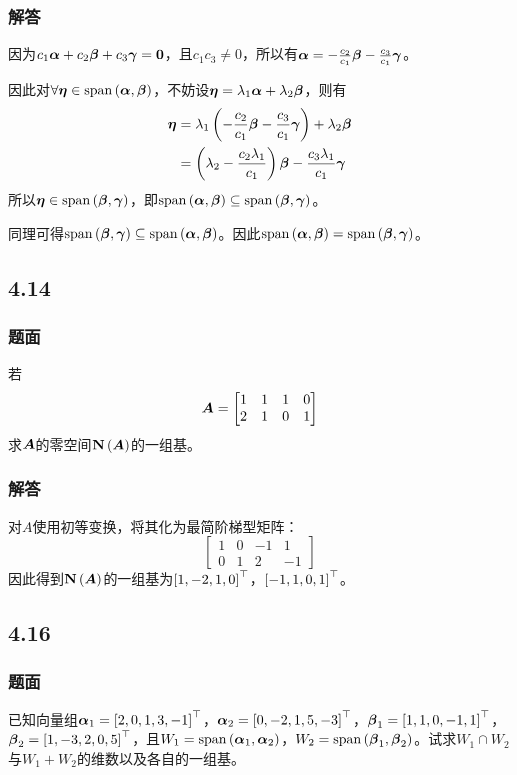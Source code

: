 \documentclass{beamer}
\begin{document}
\begin{frame}
    \frametitle{解答}
    因为\(c_1\boldsymbol{\alpha}+c_2\boldsymbol{\beta}+c_3\boldsymbol{\gamma}=\boldsymbol{0}\)，且\(c_1c_3\neq0\)，所以有\(\boldsymbol{\alpha}=-\frac{c_2}{c_1}\boldsymbol{\beta}-\frac{c_3}{c_1}\boldsymbol{\gamma}\)。

    因此对\(\forall\boldsymbol{\eta}\in\mathrm{span}\left( \boldsymbol{\alpha},\boldsymbol{\beta} \right)\)，不妨设\(\boldsymbol{\eta}=\lambda_1\boldsymbol{\alpha}+\lambda_2\boldsymbol{\beta}\)，则有
    \begin{align*}
        \boldsymbol{\eta} & =\lambda_1\left( -\frac{c_2}{c_1}\boldsymbol{\beta}-\frac{c_3}{c_1}\boldsymbol{\gamma} \right)+\lambda_2\boldsymbol{\beta} \\
                & =\left( \lambda_2-\frac{c_2\lambda_1}{c_1} \right)\boldsymbol{\beta}-\frac{c_3\lambda_1}{c_1}\boldsymbol{\gamma}
    \end{align*}
    所以\(\boldsymbol{\eta}\in\mathrm{span}\left( \boldsymbol{\beta},\boldsymbol{\gamma} \right)\)，即\(\mathrm{span}\left( \boldsymbol{\alpha},\boldsymbol{\beta} \right)\subseteq\mathrm{span}\left( \boldsymbol{\beta},\boldsymbol{\gamma} \right)\)。

    同理可得\(\mathrm{span}\left( \boldsymbol{\beta},\boldsymbol{\gamma} \right)\subseteq\mathrm{span}\left( \boldsymbol{\alpha},\boldsymbol{\beta} \right)\)。因此\(\mathrm{span}\left( \boldsymbol{\alpha},\boldsymbol{\beta} \right)=\mathrm{span}\left( \boldsymbol{\beta},\boldsymbol{\gamma} \right)\)。
\end{frame}

\subsection*{4.14}
\begin{frame}
    \frametitle{题面}
    若
    \begin{equation*}
        \boldsymbol{A}=\begin{bmatrix}1&1&1&0\\2&1&0&1\end{bmatrix}
    \end{equation*}
    求\(\boldsymbol{A}\)的零空间\(\boldsymbol{\mathrm{N}}\left( \boldsymbol{A} \right)\)的一组基。
\end{frame}

\begin{frame}
    \frametitle{解答}
    对\(A\)使用初等变换，将其化为最简阶梯型矩阵：
    \begin{equation*}
        \begin{bmatrix}
            1 & 0 & -1 & 1  \\
            0 & 1 & 2  & -1
        \end{bmatrix}
    \end{equation*}
    因此得到\(\boldsymbol{\mathrm{N}}\left( \boldsymbol{A} \right)\)的一组基为\(\left[ 1,-2,1,0 \right]^\top\)，\(\left[ -1,1,0,1 \right]^\top\)。
\end{frame}

\subsection*{4.16}
\begin{frame}
    \frametitle{题面}
    已知向量组\(\boldsymbol{\alpha}_1=\left[ 2,0,1,3,-1 \right]^\top\)，\(\boldsymbol{\alpha}_2=\left[ 0,-2,1,5,-3 \right]^\top\)，\(\boldsymbol{\beta}_1=\left[ 1,1,0,-1,1 \right]^\top\)，\(\boldsymbol{\beta}_2=\left[ 1,-3,2,0,5 \right]^\top\)，且\(W_1=\mathrm{span}\left( \boldsymbol{\alpha}_1,\boldsymbol{\alpha}_2 \right)\)，\(W_2=\mathrm{span}\left( \boldsymbol{\beta}_1,\boldsymbol{\beta}_2 \right)\)。试求\(W_1\cap W_2\)与\(W_1+W_2\)的维数以及各自的一组基。
\end{frame}
\end{document}
